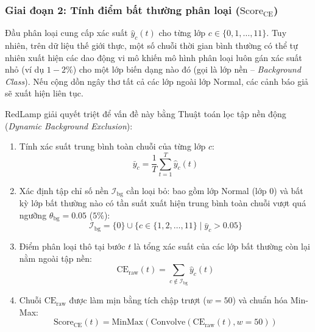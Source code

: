 \documentclass[11pt,journal,onecolumn]{IEEEtran}
\begin{document}
\subsubsection{Giai đoạn 2: Tính điểm bất thường phân loại ($\text{Score}_{\text{CE}}$)}
Đầu phân loại cung cấp xác suất $\hat{y}_c(t)$ cho từng lớp $c \in \{0, 1, \dots, 11\}$. Tuy nhiên, trên dữ liệu thế giới thực, một số chuỗi thời gian bình thường có thể tự nhiên xuất hiện các dao động vi mô khiến mô hình phân loại luôn gán xác suất nhỏ (ví dụ $1-2\%$) cho một lớp biến dạng nào đó (gọi là lớp nền -- \textit{Background Class}). Nếu cộng dồn ngây thơ tất cả các lớp ngoài lớp Normal, các cảnh báo giả sẽ xuất hiện liên tục.

RedLamp giải quyết triệt để vấn đề này bằng Thuật toán lọc tập nền động (\textit{Dynamic Background Exclusion}):
\begin{enumerate}
    \item Tính xác suất trung bình toàn chuỗi của từng lớp $c$:
    \begin{equation}
    \bar{y}_c = \frac{1}{T} \sum_{t=1}^T \hat{y}_c(t)
    \end{equation}
    \item Xác định tập chỉ số nền $\mathcal{I}_{\text{bg}}$ cần loại bỏ: bao gồm lớp Normal (lớp 0) và bất kỳ lớp bất thường nào có tần suất xuất hiện trung bình toàn chuỗi vượt quá ngưỡng $\theta_{\text{bg}} = 0.05$ ($5\%$):
    \begin{equation}
    \label{eq:bg_exclusion}
    \mathcal{I}_{\text{bg}} = \{0\} \cup \{ c \in \{1, 2, \dots, 11\} \mid \bar{y}_c > 0.05 \}
    \end{equation}
    \item Điểm phân loại thô tại bước $t$ là tổng xác suất của các lớp bất thường còn lại nằm ngoài tập nền:
    \begin{equation}
    \text{CE}_{\text{raw}}(t) = \sum_{c \notin \mathcal{I}_{\text{bg}}} \hat{y}_c(t)
    \end{equation}
    \item Chuỗi $\text{CE}_{\text{raw}}$ được làm mịn bằng tích chập trượt ($w = 50$) và chuẩn hóa Min-Max:
    \begin{equation}
    \text{Score}_{\text{CE}}(t) = \text{MinMax}( \text{Convolve}( \text{CE}_{\text{raw}}(t), w=50 ) )
    \end{equation}
\end{enumerate}
\end{document}

